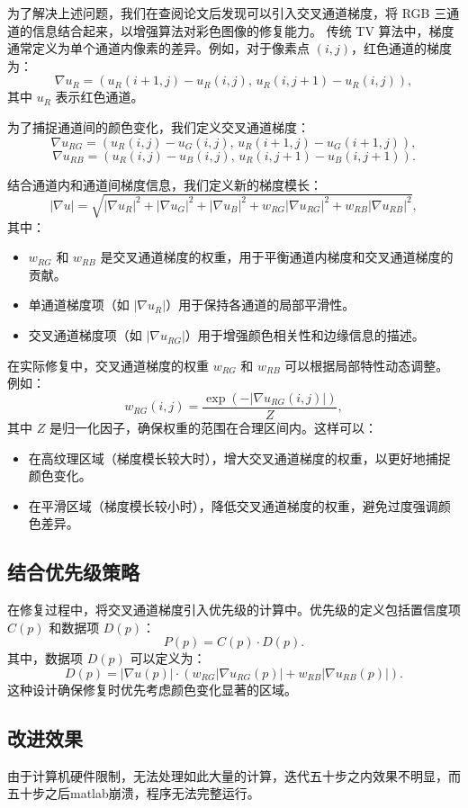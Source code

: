 \documentclass[UTF8]{ctexart}
\begin{document}
为了解决上述问题，我们在查阅论文后发现可以引入交叉通道梯度，将 RGB 三通道的信息结合起来，以增强算法对彩色图像的修复能力。
传统 TV 算法中，梯度通常定义为单个通道内像素的差异。例如，对于像素点 \((i, j)\)，红色通道的梯度为：
\[
\nabla u_R = \left( u_R(i+1, j) - u_R(i, j), \, u_R(i, j+1) - u_R(i, j) \right),
\]
其中 \(u_R\) 表示红色通道。

为了捕捉通道间的颜色变化，我们定义交叉通道梯度：
\[
\nabla u_{RG} = \left( u_R(i, j) - u_G(i, j), \, u_R(i+1, j) - u_G(i+1, j) \right),
\]
\[
\nabla u_{RB} = \left( u_R(i, j) - u_B(i, j), \, u_R(i, j+1) - u_B(i, j+1) \right).
\]

结合通道内和通道间梯度信息，我们定义新的梯度模长：
\[
|\nabla u| = \sqrt{|\nabla u_R|^2 + |\nabla u_G|^2 + |\nabla u_B|^2 + w_{RG} |\nabla u_{RG}|^2 + w_{RB} |\nabla u_{RB}|^2},
\]
其中：
\begin{itemize}
    \item \(w_{RG}\) 和 \(w_{RB}\) 是交叉通道梯度的权重，用于平衡通道内梯度和交叉通道梯度的贡献。
    \item 单通道梯度项（如 \(|\nabla u_R|\)）用于保持各通道的局部平滑性。
    \item 交叉通道梯度项（如 \(|\nabla u_{RG}|\)）用于增强颜色相关性和边缘信息的描述。
\end{itemize}
在实际修复中，交叉通道梯度的权重 \(w_{RG}\) 和 \(w_{RB}\) 可以根据局部特性动态调整。例如：
\[
w_{RG}(i, j) = \frac{\exp(-|\nabla u_{RG}(i, j)|)}{Z},
\]
其中 \(Z\) 是归一化因子，确保权重的范围在合理区间内。这样可以：
\begin{itemize}
    \item 在高纹理区域（梯度模长较大时），增大交叉通道梯度的权重，以更好地捕捉颜色变化。
    \item 在平滑区域（梯度模长较小时），降低交叉通道梯度的权重，避免过度强调颜色差异。
\end{itemize}

\subsection{结合优先级策略}
在修复过程中，将交叉通道梯度引入优先级的计算中。优先级的定义包括置信度项 \(C(p)\) 和数据项 \(D(p)\)：
\[
P(p) = C(p) \cdot D(p).
\]
其中，数据项 \(D(p)\) 可以定义为：
\[
D(p) = |\nabla u(p)| \cdot \left( w_{RG} |\nabla u_{RG}(p)| + w_{RB} |\nabla u_{RB}(p)| \right).
\]
这种设计确保修复时优先考虑颜色变化显著的区域。

\subsection{改进效果}
由于计算机硬件限制，无法处理如此大量的计算，迭代五十步之内效果不明显，而五十步之后matlab崩溃，程序无法完整运行。
\end{document}
